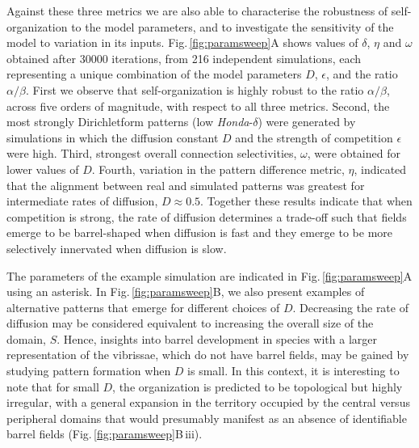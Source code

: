 \documentclass[9pt,lineno]{elife}
\newcommand{\cmnt}[1]{\textcolor{colcmnt}{#1}}
\begin{document}
\cmnt{Against these three metrics we are also able to characterise the
  robustness of self-organization to the model parameters, and to investigate
  the sensitivity of the model to variation in its inputs.} \cmnt{Fig.\,\ref{fig:paramsweep}A shows values of $\delta$, $\eta$ and
  $\omega$ obtained after 30000 iterations, from 216 independent simulations,
  each representing a unique combination of the model parameters $D$,
  $\epsilon$, and the ratio $\alpha/\beta$. First we observe that
  self-organization is highly robust to the ratio $\alpha/\beta$, across five
  orders of magnitude, with respect to all three metrics. Second, the most
  strongly Dirichletform patterns (low \emph{Honda}-$\delta$) were generated
  by simulations in which the diffusion constant $D$ and the strength of
  competition $\epsilon$ were high. Third, strongest overall connection selectivities,
  $\omega$, were obtained for lower values of $D$. Fourth, variation in the
  pattern difference metric, $\eta$, indicated that the alignment between real
  and simulated patterns was greatest for intermediate rates of diffusion,
  $D\approx0.5$. Together these results indicate that when competition is
  strong, the rate of diffusion determines a trade-off such that fields emerge
  to be barrel-shaped when diffusion is fast and they emerge to be more
  selectively innervated when diffusion is slow.}

\cmnt{The parameters of the example simulation are indicated in
  Fig.\,\ref{fig:paramsweep}A using an asterisk. In
  Fig.\,\ref{fig:paramsweep}B, we also present examples of alternative
  patterns that emerge for different choices of $D$. Decreasing the rate of
  diffusion may be considered equivalent to increasing the overall size of the
  domain, $S$. Hence, insights into barrel development in species with a
  larger representation of the vibrissae, which do not have barrel fields, may
  be gained by studying pattern formation
  when $D$ is small. In this context, it is interesting to note that for small
  $D$, the organization is predicted to be topological but highly irregular,
  with a general expansion in the territory occupied by the central versus
  peripheral domains that would presumably manifest as an absence of
  identifiable barrel fields (Fig.\,\ref{fig:paramsweep}B\,iii).}
\end{document}
